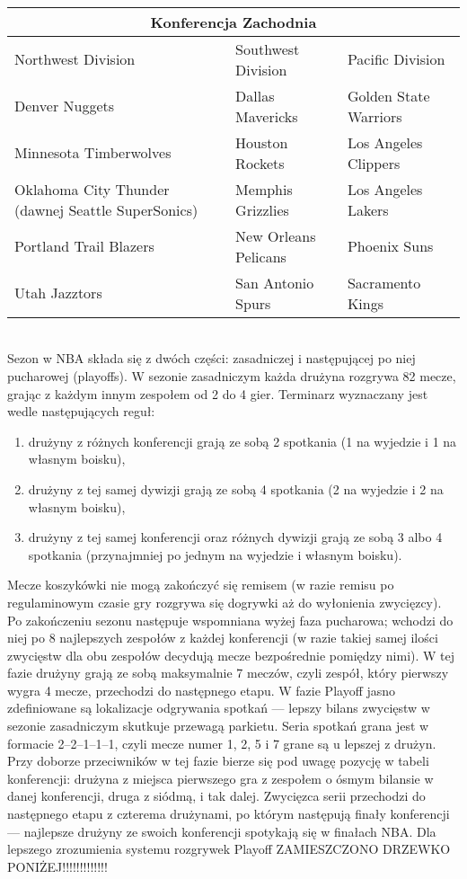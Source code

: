 \documentclass[inzynierska]{pwr_wmat_praca_dyplomowa}
\theoremstyle{plain}
\numberwithin{theorem}{chapter}
\theoremstyle{definition}
\numberwithin{theorem}{chapter}
\begin{document}
\\\\\\
\begin{tabular}{ |p{5cm}|p{5cm}|p{5cm}|  }
	\hline
	\multicolumn{3}{|c|}{Konferencja Zachodnia} \\
	\hline
	Northwest Division& Southwest Division&Pacific Division\\
	\hline
	Denver Nuggets& Dallas Mavericks &Golden State Warriors\\
	Minnesota Timberwolves&Houston Rockets &Los Angeles Clippers\\
	Oklahoma City Thunder (dawnej Seattle SuperSonics)&Memphis Grizzlies &Los Angeles Lakers\\
	Portland Trail Blazers&New Orleans Pelicans &Phoenix Suns\\
	Utah Jazztors&San Antonio Spurs&Sacramento Kings\\
	\hline
\end{tabular}
\\

Sezon w NBA składa się z dwóch części: zasadniczej i następującej po niej pucharowej (playoffs). W sezonie zasadniczym każda drużyna rozgrywa 82 mecze, grając z każdym innym zespołem od 2 do 4 gier. Terminarz wyznaczany jest wedle następujących reguł:
\begin{enumerate}
	\item drużyny z różnych konferencji grają ze sobą 2 spotkania (1 na wyjedzie i 1 na własnym boisku),
	\item drużyny z tej samej dywizji grają ze sobą 4 spotkania (2 na wyjedzie i 2 na własnym boisku),
	\item drużyny z tej samej konferencji oraz różnych dywizji grają ze sobą 3 albo 4 spotkania (przynajmniej po jednym na wyjedzie i własnym boisku).
\end{enumerate}
Mecze koszykówki nie mogą zakończyć się remisem (w razie remisu po regulaminowym czasie gry rozgrywa się dogrywki aż do wyłonienia zwycięzcy).
Po zakończeniu sezonu następuje wspomniana wyżej faza pucharowa; wchodzi do niej po 8 najlepszych zespołów z każdej konferencji (w razie takiej samej ilości zwycięstw dla obu zespołów decydują mecze bezpośrednie pomiędzy nimi). W tej fazie drużyny grają ze sobą maksymalnie 7 meczów, czyli zespół, który pierwszy wygra 4 mecze, przechodzi do następnego etapu. W fazie Playoff jasno zdefiniowane są lokalizacje odgrywania spotkań --- lepszy bilans zwycięstw w sezonie zasadniczym skutkuje przewagą parkietu. Seria spotkań grana jest w formacie 2–2–1–1–1, czyli mecze numer 1, 2, 5 i 7 grane są u lepszej z drużyn. Przy doborze przeciwników w tej fazie bierze się pod uwagę pozycję w tabeli konferencji: drużyna z miejsca pierwszego gra z zespołem o ósmym bilansie w danej konferencji, druga z siódmą, i tak dalej. Zwycięzca serii przechodzi do następnego etapu z czterema drużynami, po którym następują finały konferencji --- najlepsze drużyny ze swoich konferencji spotykają się w finałach NBA. Dla lepszego zrozumienia systemu rozgrywek Playoff ZAMIESZCZONO DRZEWKO PONIŻEJ!!!!!!!!!!!!! 
\end{document}
